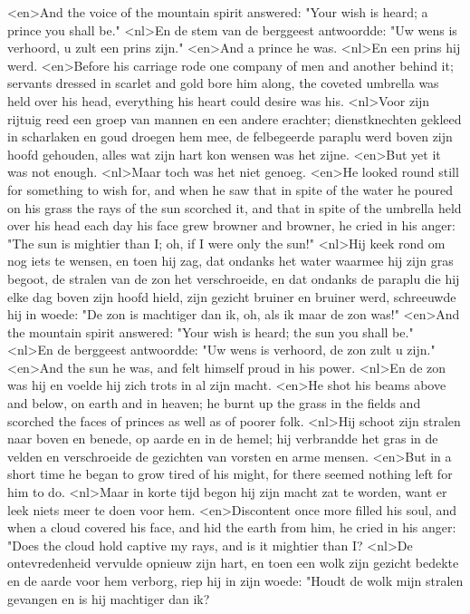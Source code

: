 <en>And the voice of the mountain spirit answered: "Your wish is heard; a prince you shall be."
<nl>En de stem van de berggeest antwoordde: "Uw wens is verhoord, u zult een prins zijn."
<en>And a prince he was.
<nl>En een prins hij werd.
<en>Before his carriage rode one company of men and another behind it; servants dressed in scarlet and gold bore him along, the coveted umbrella was held over his head, everything his heart could desire was his.
<nl>Voor zijn rijtuig reed een groep van mannen en een andere erachter; dienstknechten gekleed in scharlaken en goud droegen hem mee, de felbegeerde paraplu werd boven zijn hoofd gehouden, alles wat zijn hart kon wensen was het zijne.
<en>But yet it was not enough.
<nl>Maar toch was het niet genoeg.
<en>He looked round still for something to wish for, and when he saw that in spite of the water he poured on his grass the rays of the sun scorched it, and that in spite of the umbrella held over his head each day his face grew browner and browner, he cried in his anger: "The sun is mightier than I; oh, if I were only the sun!"
<nl>Hij keek rond  om nog iets te wensen, en toen hij zag, dat ondanks het water waarmee hij zijn gras begoot, de stralen van de zon het verschroeide, en dat ondanks de paraplu die hij elke dag boven zijn hoofd hield, zijn gezicht bruiner en bruiner werd, schreeuwde hij in woede: "De zon is machtiger dan ik, oh, als ik maar de zon was!"
<en>And the mountain spirit answered: "Your wish is heard; the sun you shall be."
<nl>En de berggeest antwoordde: "Uw wens is verhoord, de zon zult u zijn."
<en>And the sun he was, and felt himself proud in his power.
<nl>En de zon was hij en voelde hij zich trots in  al zijn macht.
<en>He shot his beams above and below, on earth and in heaven; he burnt up the grass in the fields and scorched the faces of princes as well as of poorer folk.
<nl>Hij schoot zijn stralen naar boven en benede, op aarde en in de hemel; hij verbrandde het gras in de velden en verschroeide de gezichten van vorsten en arme mensen.
<en>But in a short time he began to grow tired of his might, for there seemed nothing left for him to do.
<nl>Maar in korte tijd begon hij zijn macht zat te worden, want er leek niets meer te doen voor hem.
<en>Discontent once more filled his soul, and when a cloud covered his face, and hid the earth from him, he cried in his anger: "Does the cloud hold captive my rays, and is it mightier than I?
<nl>De ontevredenheid vervulde opnieuw zijn hart, en toen een wolk zijn gezicht bedekte en de aarde voor hem verborg, riep hij in zijn woede: "Houdt de wolk mijn stralen gevangen en is hij machtiger dan ik?
